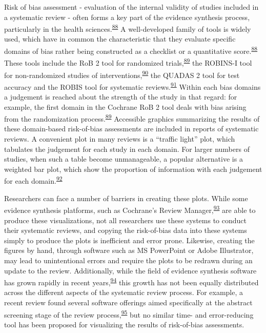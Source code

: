 \documentclass[a4paper, twoside]{templates/ociamthesis}
\begin{document}
Risk of bias assessment - evaluation of the internal validity of studies included in a systematic review - often forms a key part of the evidence synthesis process, particularly in the health sciences.\textsuperscript{\protect\hyperlink{ref-cochranechpt7}{88}} A well-developed family of tools is widely used, which have in common the characteristic that they evaluate specific domains of bias rather being constructed as a checklist or a quantitative score.\textsuperscript{\protect\hyperlink{ref-cochranechpt7}{88}} These tools include the RoB 2 tool for randomized trials,\textsuperscript{\protect\hyperlink{ref-sterne2019rob}{89}} the ROBINS-I tool for non-randomized studies of interventions,\textsuperscript{\protect\hyperlink{ref-sterne2016robins}{90}} the QUADAS 2 tool for test accuracy and the ROBIS tool for systematic reviews.\textsuperscript{\protect\hyperlink{ref-whiting2011quadas}{91}} Within each bias domains a judgement is reached about the strength of the study in that regard: for example, the first domain in the Cochrane RoB 2 tool deals with bias arising from the randomization process.\textsuperscript{\protect\hyperlink{ref-sterne2019rob}{89}} Accessible graphics summarizing the results of these domain-based risk-of-bias assessments are included in reports of systematic reviews. A convenient plot in many reviews is a ``traffic light'' plot, which tabulates the judgement for each study in each domain. For larger numbers of studies, when such a table become unmanageable, a popular alternative is a weighted bar plot, which show the proportion of information with each judgement for each domain.\textsuperscript{\protect\hyperlink{ref-higgins2008assessing}{92}}

Researchers can face a number of barriers in creating these plots. While some evidence synthesis platforms, such as Cochrane's Review Manager,\textsuperscript{\protect\hyperlink{ref-cochrane2014review}{93}} are able to produce these visualizations, not all researchers use these systems to conduct their systematic reviews, and copying the risk-of-bias data into these systems simply to produce the plots is inefficient and error prone. Likewise, creating the figures by hand, through software such as MS PowerPoint or Adobe Illustrator, may lead to unintentional errors and require the plots to be redrawn during an update to the review. Additionally, while the field of evidence synthesis software has grown rapidly in recent years,\textsuperscript{\protect\hyperlink{ref-marshall2015systematic}{94}} this growth has not been equally distributed across the different aspects of the systematic review process. For example, a recent review found several software offerings aimed specifically at the abstract screening stage of the review process,\textsuperscript{\protect\hyperlink{ref-harrison2020software}{95}} but no similar time- and error-reducing tool has been proposed for visualizing the results of risk-of-bias assessments.
\end{document}
